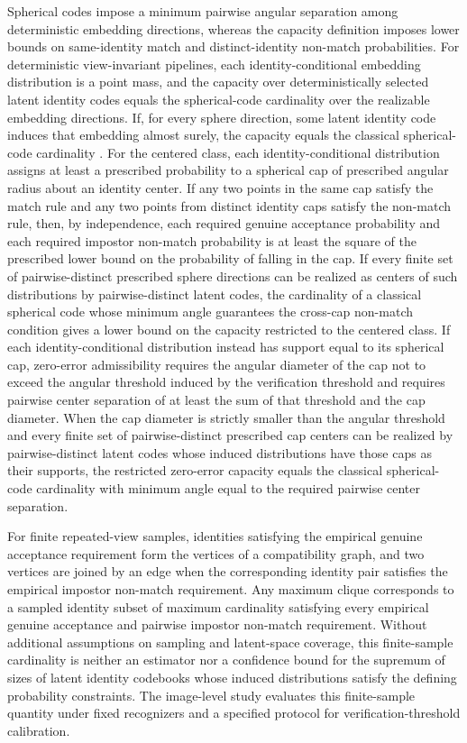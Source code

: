 \documentclass[journal]{IEEEtran}
\begin{document}
\begin{bibunit}
Spherical codes impose a minimum pairwise angular separation among deterministic embedding directions, whereas the capacity definition imposes lower bounds on same-identity match and distinct-identity non-match probabilities. For deterministic view-invariant pipelines, each identity-conditional embedding distribution is a point mass, and the capacity over deterministically selected latent identity codes equals the spherical-code cardinality over the realizable embedding directions. If, for every sphere direction, some latent identity code induces that embedding almost surely, the capacity equals the classical spherical-code cardinality \cite{rankin1955closest,conway2013sphere}. For the centered class, each identity-conditional distribution assigns at least a prescribed probability to a spherical cap of prescribed angular radius about an identity center. If any two points in the same cap satisfy the match rule and any two points from distinct identity caps satisfy the non-match rule, then, by independence, each required genuine acceptance probability and each required impostor non-match probability is at least the square of the prescribed lower bound on the probability of falling in the cap. If every finite set of pairwise-distinct prescribed sphere directions can be realized as centers of such distributions by pairwise-distinct latent codes, the cardinality of a classical spherical code whose minimum angle guarantees the cross-cap non-match condition gives a lower bound on the capacity restricted to the
centered class. If each identity-conditional distribution instead has support equal to its spherical cap, zero-error admissibility requires the angular diameter of the cap not to exceed the angular threshold induced by the verification threshold and requires pairwise center separation of at least the sum of that threshold and the cap diameter. When the cap diameter is strictly smaller than the angular threshold and every finite set of pairwise-distinct prescribed cap centers can be realized by pairwise-distinct latent codes whose induced distributions have those caps as their supports, the restricted zero-error capacity equals the classical spherical-code cardinality with minimum angle equal to the required pairwise center separation.

For finite repeated-view samples, identities satisfying the empirical genuine acceptance requirement form the vertices of a compatibility graph, and two vertices are joined by an edge when the corresponding identity pair satisfies the empirical impostor non-match requirement. Any maximum clique corresponds to a sampled identity subset of maximum cardinality satisfying every empirical genuine acceptance and pairwise impostor non-match requirement. Without additional assumptions on sampling and latent-space coverage, this finite-sample cardinality is neither an estimator nor a confidence bound for the supremum of sizes of latent identity codebooks whose induced distributions satisfy the defining probability constraints. The image-level study evaluates this finite-sample quantity under fixed recognizers and a specified protocol for verification-threshold calibration.




\end{bibunit}
\end{document}
